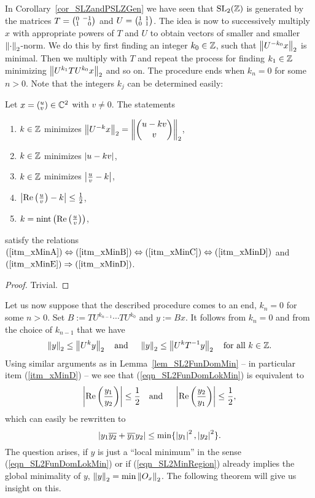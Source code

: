 In Corollary~\ref{cor_SLZandPSLZGen} we have seen that $\SL{\Z}$ is generated by the matrices $T = \smallmat{0}{-1}{1}{\phantom{-}0}$ and $U = \smallmat{1}{1}{0}{1}$. The idea is now to successively multiply $x$ with appropriate powers of $T$ and $U$ to obtain vectors of smaller and smaller $\eucnorm{\cdot}$-norm. We do this by first finding an integer $k_0 \in \Z$, such that $\eucnorm{U^{-k_0}x}$ is minimal. Then we multiply with $T$ and repeat the process for finding $k_1 \in \Z$ minimizing $\eucnorm{U^{k_1} T U^{k_0} x}$ and so on. The procedure ends when $k_n = 0$ for some $n>0$. Note that the integers $k_j$ can be determined easily:
\begin{lemma}
\label{lem_SL2FunDomMin}
Let $x = ({}^u_v)\in \C^2$ with $v \ne 0$. The statements
\begin{enumerate}[\qquad(i)]
\item \label{itm_xMinA}
$k \in \Z$ minimizes $\eucnorm{U^{-k}x} = \eucnorm{\cvec{u - k v}{v}}$,
\item \label{itm_xMinB} $k \in \Z$ minimizes $\abs{u - k v}$,
\item \label{itm_xMinC} $k \in \Z$ minimizes $\abs{\frac{u}{v} - k}$,
\item \label{itm_xMinD} $\abs{\Re{\frac{u}{v}} - k} \le \reci{2}$,
\item \label{itm_xMinE} $k = \nint{\Re{\frac{u}{v}}}$,
\end{enumerate}
satisfy the relations $(\ref{itm_xMinA}) \Leftrightarrow (\ref{itm_xMinB}) \Leftrightarrow (\ref{itm_xMinC}) \Leftrightarrow (\ref{itm_xMinD})$ and $(\ref{itm_xMinE}) \Rightarrow (\ref{itm_xMinD})$.
\end{lemma}
\begin{proof}
Trivial.
\end{proof}
Let us now suppose that the described procedure comes to an end, \ie $k_n = 0$ for some $n > 0$. Set $B  := TU^{k_{n-1}} \cdots TU^{k_0}$ and $y :=  Bx$. It follows from $k_n = 0$ and from the choice of $k_{n-1}$ that we have 
\begin{equation}
\label{eqn_SL2FunDomLokMin}
\eucnorm{y} \le \eucnorm{U^k y} \text{\quad and \quad} \eucnorm{y} \le \eucnorm{U^k \inv{T} y} \text{\quad for all } k \in \Z.
\end{equation}
Using similar arguments as in Lemma~\ref{lem_SL2FunDomMin} -- in particular item (\ref{itm_xMinD}) -- we see that (\ref{eqn_SL2FunDomLokMin}) is equivalent to
\begin{equation*}
\abs{\Re{\frac{y_1}{y_2}}} \le \reci{2} \text{\quad and \quad} \abs{\Re{\frac{y_2}{y_1}}} \le \reci{2},
\end{equation*}
which can easily be rewritten to
\begin{equation}
\label{eqn_SL2MinRegion}
\abs{y_1 \conj{y_2} + \conj{y_1} y_2} \le \min\{\abs{y_1}^2, \abs{y_2}^2\}.
\end{equation}
The question arises, if $y$ is just a ``local minimum'' in the sense (\ref{eqn_SL2FunDomLokMin}) or if (\ref{eqn_SL2MinRegion}) already implies the global minimality of $y$, \ie $\eucnorm{y} = \min \eucnorm{O_x}$. The following theorem will give us insight on this.

